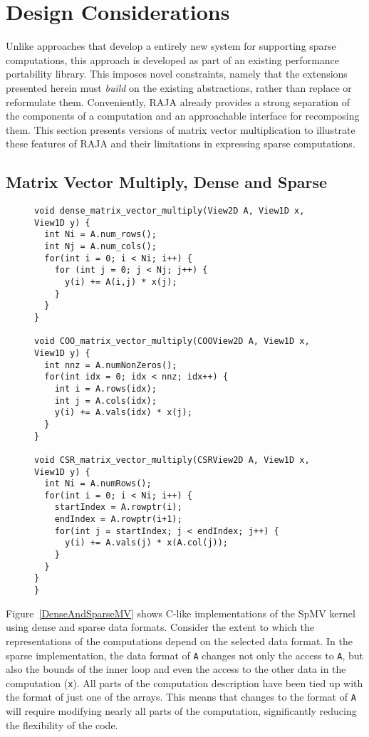 \section{Design Considerations}
Unlike approaches that develop a entirely new system for supporting sparse computations, this approach is developed as part of an existing performance portability library.
This imposes novel constraints, namely that the extensions presented herein must \textit{build} on the existing abstractions, rather than replace or reformulate them.
Conveniently, RAJA already provides a strong separation of the components of a computation and an approachable interface for recomposing them.
This section presents versions of matrix vector multiplication to illustrate these features of RAJA and their limitations in expressing sparse computations.


\subsection{Matrix Vector Multiply, Dense and Sparse}

\begin{figure}
\begin{lstlisting}[caption={matrix vector multiply routines for matrices in different formats.},label=DenseAndSparseMV]  
void dense_matrix_vector_multiply(View2D A, View1D x, View1D y) {
  int Ni = A.num_rows();
  int Nj = A.num_cols();
  for(int i = 0; i < Ni; i++) {
    for (int j = 0; j < Nj; j++) {
      y(i) += A(i,j) * x(j);
    }
  }
}

void COO_matrix_vector_multiply(COOView2D A, View1D x, View1D y) {
  int nnz = A.numNonZeros();
  for(int idx = 0; idx < nnz; idx++) {
    int i = A.rows(idx);
    int j = A.cols(idx);
    y(i) += A.vals(idx) * x(j);
  }
}

void CSR_matrix_vector_multiply(CSRView2D A, View1D x, View1D y) {
  int Ni = A.numRows();
  for(int i = 0; i < Ni; i++) {
    startIndex = A.rowptr(i);
    endIndex = A.rowptr(i+1);
    for(int j = startIndex; j < endIndex; j++) {
      y(i) += A.vals(j) * x(A.col(j));
    }
  }
}
}
\end{lstlisting}
\end{figure}
Figure~\ref{DenseAndSparseMV} shows C-like implementations of the SpMV kernel using dense and sparse data formats.
Consider the extent to which the representations of the computations depend on the selected data format.
In the sparse implementation, the data format of \verb.A. changes not only the access to \verb.A., but also the bounds of the inner loop and even the access to the other data in the computation (\verb.x.).
All parts of the computation description have been tied up with the format of just one of the arrays.
This means that changes to the format of \verb.A. will require modifying nearly all parts of the computation, significantly reducing the flexibility of the code.


